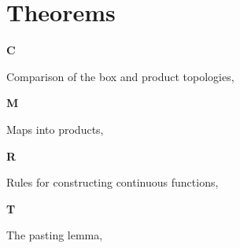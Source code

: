 \section*{Theorems}

\vspace{1em}\noindent\large{\textbf{C}}

Comparison of the box and product topologies, \pageref{theorem:ComparisonOfBoxProductTopology}

\vspace{1em}\noindent\large{\textbf{M}}

Maps into products, \pageref{theorem:MapsIntoProducts}

\vspace{1em}\noindent\large{\textbf{R}}

Rules for constructing continuous functions, \pageref{theorem:RulesForConstructingContinuousFunctions}

\vspace{1em}\noindent\large{\textbf{T}}

The pasting lemma, \pageref{theorem:ThePastingLemma}

